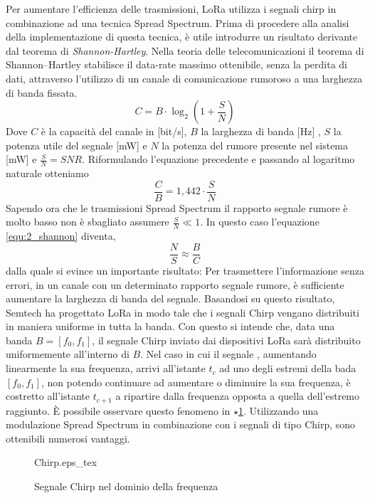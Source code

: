Per aumentare l'efficienza delle trasmissioni, LoRa utilizza i segnali chirp in
combinazione ad una tecnica  Spread Spectrum. 
Prima di procedere alla analisi della implementazione di questa tecnica,
 è utile introdurre un risultato derivante dal teorema di \textit{Shannon-Hartley}.
Nella teoria delle telecomunicazioni il teorema di Shannon–Hartley stabilisce il
data-rate massimo ottenibile, senza la perdita di dati, attraverso l'utilizzo di un canale di comunicazione 
rumoroso a una larghezza di banda fissata.
\begin{equation}
        C = B\cdot \log_2\left(1+\frac{S}{N}\right)
\end{equation}
Dove $C$ è la capacità del canale in [bit/s], $B$ la larghezza di banda [Hz] , $S$ la
potenza utile del segnale  [mW] e $N$ la potenza del rumore presente nel
sistema [mW] e $\frac{S}{N}=SNR$.
Riformulando l'equazione precedente e passando al logaritmo naturale otteniamo
\begin{equation}\label{equ:2_shannon}
        \frac{C}{B} = 1,442 \cdot \frac{S}{N}
\end{equation}
Sapendo ora che le trasmissioni Spread Spectrum il rapporto segnale rumore è
molto basso non è sbagliato assumere $\frac{S}{N} \ll 1$. 
In questo caso l'equazione \ref{equ:2_shannon} diventa,
\begin{equation}
        \frac{N}{S} \approx \frac{B}{C}
\end{equation}
dalla quale si evince un importante risultato: 
Per trasmettere l'informazione senza errori, in un canale con un determinato rapporto
segnale rumore, è sufficiente aumentare la larghezza di banda del segnale. 
Basandosi su questo risultato, Semtech ha progettato LoRa in modo tale che i segnali Chirp vengano
distribuiti in maniera uniforme in tutta la banda. 
Con questo si intende che, data una banda $B =
[f_0,f_1]$, il segnale Chirp inviato dai dispositivi LoRa sarà distribuito
uniformemente all'interno di $B$. 
Nel caso in cui il segnale ,  aumentando linearmente la sua frequenza,
arrivi all'istante $t_c$ ad uno degli estremi della bada $[f_0,f_1]$, non potendo
continuare ad aumentare o diminuire la sua frequenza,
 è costretto all'istante $t_{c+1}$ a ripartire dalla frequenza opposta a quella
dell'estremo raggiunto. È possibile osservare questo fenomeno in
\hyperlink{label_in_fig_1}{$\star$}\ref{fig:chirp_freq}.
Utilizzando una modulazione Spread Spectrum in combinazione con i segnali di tipo
Chirp, sono ottenibili numerosi vantaggi.
\begin{figure}[ht]
        \centering
                {Chirp.eps_tex}
        \caption{Segnale Chirp nel dominio della frequenza}
        \label{fig:chirp_freq}
\end{figure}
